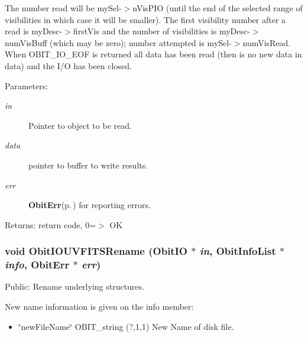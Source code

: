 The number read will be my\-Sel-$>$n\-Vis\-PIO (until the end of the selected range of visibilities in which case it will be smaller). The first visibility number after a read is my\-Desc-$>$first\-Vis and the number of visibilities is my\-Desc-$>$num\-Vis\-Buff (which may be zero); number attempted is my\-Sel-$>$num\-Vis\-Read. When OBIT\_\-IO\_\-EOF is returned all data has been read (then is no new data in data) and the I/O has been closed. \begin{Desc}
\item[Parameters:]
\begin{description}
\item[{\em in}]Pointer to object to be read. \item[{\em data}]pointer to buffer to write results. \item[{\em err}]{\bf Obit\-Err}{\rm (p.\,\pageref{structObitErr})} for reporting errors. \end{description}
\end{Desc}
\begin{Desc}
\item[Returns:]return code, 0=$>$ OK \end{Desc}
\subsubsection{\setlength{\rightskip}{0pt plus 5cm}void Obit\-IOUVFITSRename ({\bf Obit\-IO} $\ast$ {\em in}, {\bf Obit\-Info\-List} $\ast$ {\em info}, {\bf Obit\-Err} $\ast$ {\em err})}\label{ObitIOUVFITS_8c_a21}


Public: Rename underlying structures. 

New name information is given on the info member: \begin{itemize}
\item \char`\"{}new\-File\-Name\char`\"{} OBIT\_\-string (?,1,1) New Name of disk file. 
\end{itemize}
